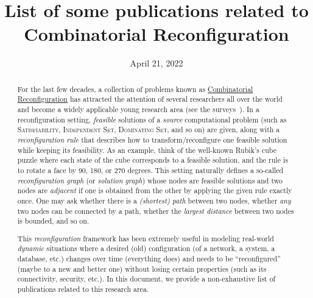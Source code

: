 \documentclass[a4paper]{article}
\title{List of some publications related to Combinatorial Reconfiguration}
\date{April 21, 2022}
\begin{document}
	\nocite{*}
	
	\maketitle
	
	\begin{abstract}
		For the last few decades, a collection of problems known as \href{https://en.wikipedia.org/wiki/Reconfiguration}{Combinatorial Reconfiguration} has attracted the attention of several researchers all over the world and become a widely applicable young research area (see the surveys~\cite{books/cu/p/Heuvel13,journals/algorithms/Nishimura18,conf/seiccgtc/MynhardtN19}).
		In a reconfiguration setting, \textit{feasible} solutions of a \textit{source} computational problem (such as \textsc{Satisfiability}, \textsc{Independent Set}, \textsc{Dominating Set}, and so on) are given, along with a \textit{reconfiguration rule} that describes how to transform/reconfigure one feasible solution while keeping its feasibility.
		As an example, think of the well-known Rubik's cube puzzle where each state of the cube corresponds to a feasible solution, and the rule is to rotate a face by 90, 180, or 270 degrees.
		This setting naturally defines a so-called \textit{reconfiguration graph} (or \textit{solution graph}) whose nodes are feasible solutions and two nodes are \textit{adjacent} if one is obtained from the other by applying the given rule exactly once.
		One may ask whether there is a \textit{(shortest) path} between two nodes, whether \textit{any} two nodes can be connected by a path, whether the \textit{largest distance} between two nodes is bounded, and so on.
		
		This \textit{reconfiguration} framework has been extremely useful in modeling real-world \textit{dynamic} situations where a desired (old) configuration (of a network, a system, a database, etc.) changes over time (everything does) and needs to be ``reconfigured'' (maybe to a new and better one) without losing certain properties (such as its connectivity, security, etc.).
		In this document, we provide a non-exhaustive list of publications related to this research area.
	\end{abstract}
	
	\clearpage
	
	\tableofcontents
	
	\clearpage
	
 	\printbibbyyear
\end{document}
